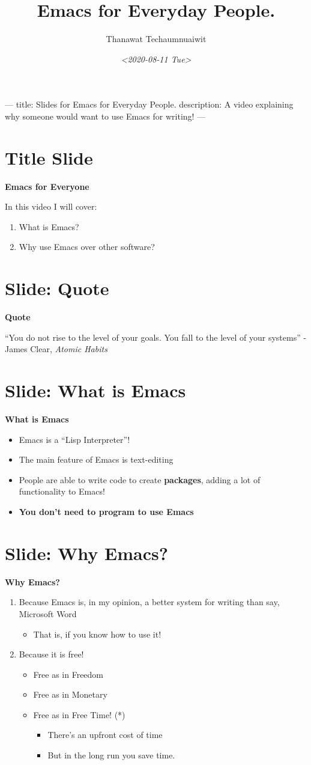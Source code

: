 \documentclass[11pt]{article}
\author{Thanawat Techaumnuaiwit}
\date{\textit{<2020-08-11 Tue>}}
\title{Emacs for Everyday People.}
\begin{document}
\maketitle
---
title: Slides for Emacs for Everyday People.
description: A video explaining why someone would want to use Emacs for writing!
---
\section{Title Slide}
\label{sec:org397e900}
\textbf{Emacs for Everyone}

In this video I will cover:
\begin{enumerate}
\item What is Emacs?
\item Why use Emacs over other software?
\end{enumerate}
\section{Slide: Quote}
\label{sec:org07f84c0}
\textbf{Quote}

``You do not rise to the level of your goals. You fall to the level of your systems'' - James Clear, \emph{Atomic Habits}
\section{Slide: What is Emacs}
\label{sec:orgdf63e7e}
\textbf{What is Emacs}

\begin{itemize}
\item Emacs is a ``Lisp Interpreter''!
\item The main feature of Emacs is text-editing
\item People  are able to write code to
create \textbf{packages}, adding a lot of
functionality to Emacs!
\item \textbf{You don't need to program to use Emacs}
\end{itemize}
\section{Slide: Why Emacs?}
\label{sec:orgd0276e3}
\textbf{Why Emacs?}

\begin{enumerate}
\item Because Emacs is, in my opinion, a better system for writing than say, Microsoft Word
\begin{itemize}
\item That is, if you know how to use it!
\end{itemize}
\item Because it is free!
\begin{itemize}
\item Free as in Freedom
\item Free as in Monetary
\item Free as in Free Time! (*)
\begin{itemize}
\item There's an upfront cost of time
\item But in the long run you save time.
\end{itemize}
\end{itemize}
\end{enumerate}
\end{document}
